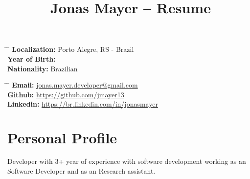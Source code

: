 \documentclass[10pt]{article} %
\begin{document}

\title{Jonas Mayer -- Resume} %


\parbox{0.5\textwidth}{ %
\begin{tabbing} %
\hspace{3cm} \= \hspace{4cm} \= \kill %
{\bf Localization:} \> Porto Alegre, RS - Brazil\\ %
{\bf Year of Birth:}  \\ %
{\bf Nationality:} \> Brazilian %
\end{tabbing}}
\hfill %
\parbox{0.5\textwidth}{ %
\begin{tabbing} %
\hspace{2cm} \= \hspace{5cm} \= \kill %
{\bf Email:} \> \href{mailto:jonas.mayer.developer@gmail.com}{jonas.mayer.developer@gmail.com} \\ %
{\bf Github:} \> \href{https://github.com/jmayer13}{https://github.com/jmayer13} \\
{\bf Linkedin:} \> \href{https://br.linkedin.com/in/jonasmayer}{https://br.linkedin.com/in/jonasmayer} \\
\end{tabbing}}


\section{Personal Profile}

Developer with 3+ year of experience with software development working as an Software Developer and as an Research assistant.
\end{document}
